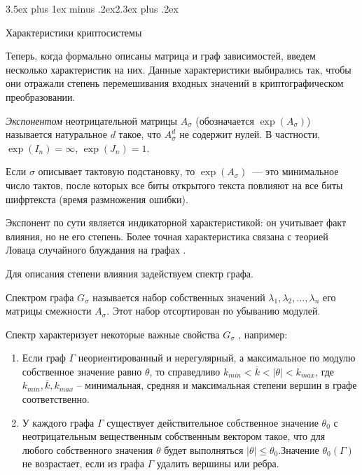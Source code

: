 \documentclass[a4paper,12pt]{report}
\makeatletter
\theoremstyle{plain} %
\theoremstyle{definition}
\theoremstyle{remark}
\renewcommand{\section}{\@startsection{section}{1}{18pt}%
{3.5ex plus 1ex minus .2ex}{2.3ex plus .2ex}%
{\normalfont\Large\bfseries\raggedright}}%
\makeatother
\begin{document}
\begin{large}
\section{Характеристики криптосистемы}

Теперь, когда формально описаны матрица и граф зависимостей, введем несколько характеристик на них. Данные характеристики выбирались так, чтобы они отражали степень перемешивания входных значений в криптографическом преобразовании.

{\it Экспонентом} неотрицательной матрицы $A_\sigma$
(обозначается $\exp(A_\sigma)$)
называется натуральное $d$ такое, что 
$A_\sigma^d$ не содержит нулей.
В частности, $\exp(I_n)=\infty$, $\exp(J_n)=1$.

Если $\sigma$ описывает тактовую подстановку,
то $\exp(A_\sigma)$~--- это минимальное число тактов,
после которых все биты открытого текста повлияют 
на все биты шифртекста (время размножения ошибки).


Экспонент по сути является индикаторной характеристикой:
он учитывает факт влияния, но не его степень.
Более точная характеристика связана с теорией Ловаца
случайного блуждания на графах \cite{lovasz_walks}.

Для описания степени влияния задействуем спектр графа.

Спектром графа $G_{\sigma}$ называется набор собственных значений $\lambda_1, \lambda_2,...,\lambda_n$ его матрицы смежности $A_{\sigma}$. Этот набор отсортирован по убыванию модулей. 

Спектр характеризует некоторые важные свойства $G_{\sigma}$ \cite{lovasz_eigenvalues}, например:

\begin{enumerate}

\item Если граф $\Gamma$ неориентированный и нерегулярный, а максимальное по модулю собственное значение равно $\theta$, то справедливо $k_{min} < \overline{k} < |\theta| < k_{max}$, где $k_{min}, \overline{k}, k_{max}$ --  минимальная, средняя и максимальная степени вершин в графе соответственно.

\item У каждого графа $\Gamma$ существует действительное собственное значение $\theta_0$ с неотрицательным вещественным собственным вектором такое, что для любого собственного значения $\theta$ будет выполняться $|\theta| \leq \theta_0$.Значение $\theta_0(\Gamma)$ не возрастает, если из графа $\Gamma$ удалить вершины или ребра.


\end{enumerate}
\end{large}
\end{document}
